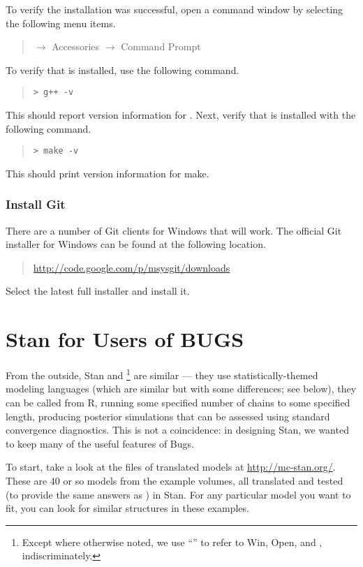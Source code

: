 To verify the installation was successful, open a command window by
selecting the following menu items.
%
\begin{quote}
  $\rightarrow$ Accessories 
  $\rightarrow$ Command Prompt
\end{quote}
%
To verify that \gpp is installed, use the following command.
%
\begin{quote}
  \Verb|> g++ -v|
\end{quote}
%
This should report version information for \gpp.  Next, verify that
 is installed with the following command.
%
\begin{quote}
  \Verb|> make -v|
\end{quote}
%
This should print version information for make.

\subsection{Install Git}

There are a number of Git clients for Windows that will work.  The
official Git installer for Windows can be found at the following
location.
%
\begin{quote}
\url{http://code.google.com/p/msysgit/downloads}
\end{quote}
%
Select the latest full installer and install it. 

\chapter{Stan for Users of BUGS}\label{stan-for-bugs.appendix}

From the outside, Stan and \BUGS%
%
\footnote{Except where otherwise noted, we use ``\BUGS'' to refer to
  Win\BUGS, Open\BUGS, and \JAGS, indiscriminately.}
%
are similar --- they use statistically-themed modeling languages
(which are similar but with some differences; see below), they can be
called from R, running some specified number of chains to some
specified length, producing posterior simulations that can be assessed
using standard convergence diagnostics.  This is not a coincidence:
in designing Stan, we wanted to keep many of the useful features of
Bugs.

To start, take a look at the files of translated \BUGS models at
\url{http://mc-stan.org/}.  These are 40 or so models from the \BUGS
example volumes, all translated and tested (to provide the same
answers as \BUGS) in Stan.  For any particular model you want to fit,
you can look for similar structures in these examples.

